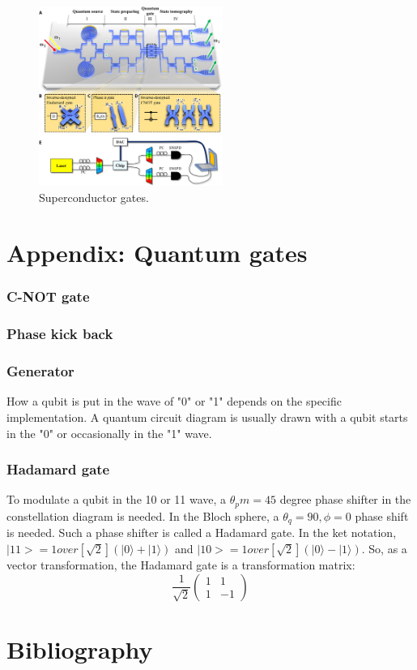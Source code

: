 \documentclass{book}
\newcommand\keta[2][]{#1\lvert {#2} #1\rangle}
\begin{document}
\begin{figure}[ht]
\includegraphics[width=6cm]{pic/superGates.jpg}
\caption{Superconductor gates.}
\label{superGates}
\end{figure}

\chapter{Appendix: Quantum gates}

\subsection{C-NOT gate}
\subsection{Phase kick back}

\subsection{Generator}
How a qubit is put in the wave of "0" or "1" depends on the specific implementation. A quantum circuit diagram is usually drawn with a qubit starts in the "0" or occasionally in the "1" wave.

\subsection{Hadamard gate}
To modulate a qubit in the 10 or 11 wave, a $\theta_pm = 45$ degree phase shifter in the constellation diagram is needed. In the Bloch sphere, a $\theta_q =90, \phi=0$ phase shift is needed. Such a phase shifter is called a Hadamard gate. In the ket notation, $|11> = 1 over [\sqrt 2] (\keta{0} + \keta{1})$ and $|10> = 1 over [\sqrt 2] (\keta{0} - \keta{1})$. So, as a vector transformation, the Hadamard gate is a transformation matrix:
\begin{equation}
    \frac 1 {\sqrt 2}
    \begin{pmatrix}
1 & 1 \\
1 & -1
\end{pmatrix}
\end{equation}

\chapter{Bibliography}

   

\backmatter
{}
\printindex
\end{document}
